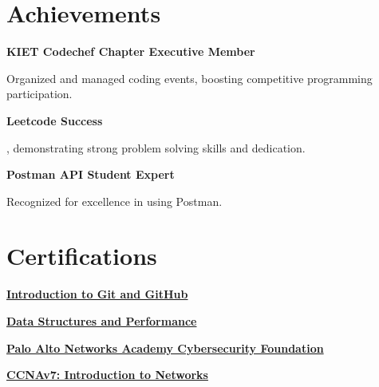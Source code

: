 \documentclass[letterpaper,10pt]{article}
\newcommand{\heading}[2]{
  \hspace{10pt}#1\hfill#2\\
}
\newcommand{\headingBf}[2]{
  \heading{\textbf{#1}}{\textbf{#2}}
}
\newenvironment{resume_list}{
  \vspace{-7pt}
  \begin{itemize}[itemsep=-2px, parsep=1pt, leftmargin=30pt]
}{
  \end{itemize}
}
\begin{document}
\section{Achievements}
\headingBf{KIET Codechef Chapter Executive Member}{}
\begin{resume_list}
  \item Organized and managed coding events, boosting competitive programming participation.
\end{resume_list}

\headingBf{Leetcode Success \href{https://www.leetcode.com/1md3nd}{\small\textit{\color{gray}{Link}}}}{}
\begin{resume_list}
  \item \textbf{\color{accentTitle}{Solved over 700 algorithm problems}}, demonstrating strong problem solving skills and dedication.
\end{resume_list}

\headingBf{Postman API Student Expert}{}
\begin{resume_list}
  \item Recognized for excellence in \textbf{\color{accentTitle}{API design, testing, and automation}} using Postman.
\end{resume_list}

\section{Certifications}
\begin{resume_list}  
  \item \headingBf{\href{https://www.coursera.org/account/accomplishments/verify/VAXY9EEWXD3C}{Introduction to Git and GitHub}}{}
  \item \headingBf{\href{https://www.coursera.org/account/accomplishments/verify/MEHYBBVAYE8E}{Data Structures and Performance}}{}
  \item \headingBf{\href{https://www.coursera.org/account/accomplishments/verify/R73VUS4L44RN}{Palo Alto Networks Academy Cybersecurity Foundation}}{}
  \item \headingBf{\href{https://drive.google.com/file/d/15n4G1_3d75gbxfikhzodotRZVXInxqhJ/view?usp=sharing}{CCNAv7: Introduction to Networks}}{}
\end{resume_list}
\end{document}
